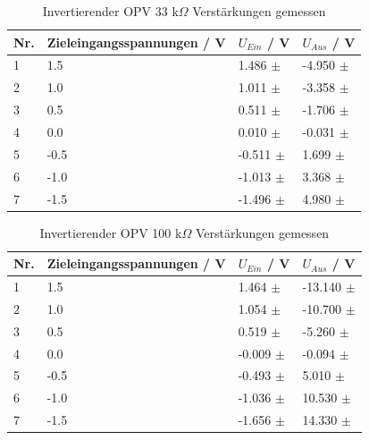 \documentclass[12pt,a4paper,twoside]{article}
\begin{document}
\begin{table}[H]
    \centering
    \caption{Invertierender OPV 33 k$\Omega$ Verstärkungen gemessen}
    \label{tab:IoVerstärkungenGemessen33}
    \begin{tabular}{| l | l | l | l |}
        \hline
        Nr. & Zieleingangsspannungen / V & $U_{Ein}$ / V & $U_{Aus}$ / V \\
        \hline
        1 &  1.5 &  1.486 $\pm$  & -4.950 $\pm$  \\
        2 &  1.0 &  1.011 $\pm$  & -3.358 $\pm$  \\
        3 &  0.5 &  0.511 $\pm$  & -1.706 $\pm$  \\
        4 &  0.0 &  0.010 $\pm$  & -0.031 $\pm$  \\
        5 & -0.5 & -0.511 $\pm$  &  1.699 $\pm$  \\
        6 & -1.0 & -1.013 $\pm$  &  3.368 $\pm$  \\
        7 & -1.5 & -1.496 $\pm$  &  4.980 $\pm$  \\
        \hline
    \end{tabular}
\end{table}

\begin{table}[H]
    \centering
    \caption{Invertierender OPV 100 k$\Omega$ Verstärkungen gemessen}
    \label{tab:IoVerstärkungenGemessen100}
    \begin{tabular}{| l | l | l | l |}
        \hline
        Nr. & Zieleingangsspannungen / V & $U_{Ein}$ / V & $U_{Aus}$ / V \\
        \hline
        1 &  1.5 &  1.464 $\pm$  & -13.140 $\pm$  \\
        2 &  1.0 &  1.054 $\pm$  & -10.700 $\pm$  \\
        3 &  0.5 &  0.519 $\pm$  &  -5.260 $\pm$  \\
        4 &  0.0 & -0.009 $\pm$  &  -0.094 $\pm$  \\
        5 & -0.5 & -0.493 $\pm$  &   5.010 $\pm$  \\
        6 & -1.0 & -1.036 $\pm$  &  10.530 $\pm$  \\
        7 & -1.5 & -1.656 $\pm$  &  14.330 $\pm$  \\
        \hline
    \end{tabular}
\end{table}
\end{document}
